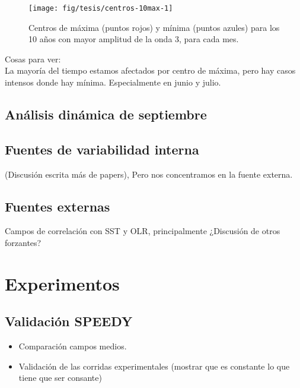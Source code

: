 \documentclass[spanish,a4paper]{book}
\providecommand{\tightlist}{%
  \setlength{\itemsep}{0pt}\setlength{\parskip}{0pt}}
\begin{document}
\begin{figure}

{\centering \texttt{[image: fig/tesis/centros-10max-1]} 

}

\caption{Centros de máxima (puntos rojos) y mínima (puntos azules) para los 10 años con mayor amplitud de la onda 3, para cada mes.}\label{fig:centros-10max}
\end{figure}

Cosas para ver:\\
La mayoría del tiempo estamos afectados por centro de máxima, pero hay
casos intensos donde hay mínima. Especialmente en junio y julio.

\section{Análisis dinámica de
septiembre}\label{analisis-dinamica-de-septiembre}

\section{Fuentes de variabilidad
interna}\label{fuentes-de-variabilidad-interna}

(Discusión escrita más de papers), Pero nos concentramos en la fuente
externa.

\section{Fuentes externas}\label{fuentes-externas}

Campos de correlación con SST y OLR, principalmente ¿Discusión de otros
forzantes?

\chapter{Experimentos}\label{experimentos}

\section{Validación SPEEDY}\label{validacion-speedy}

\begin{itemize}
\tightlist
\item
  Comparación campos medios.
\item
  Validación de las corridas experimentales (mostrar que es constante lo
  que tiene que ser consante)
\end{itemize}
\end{document}
